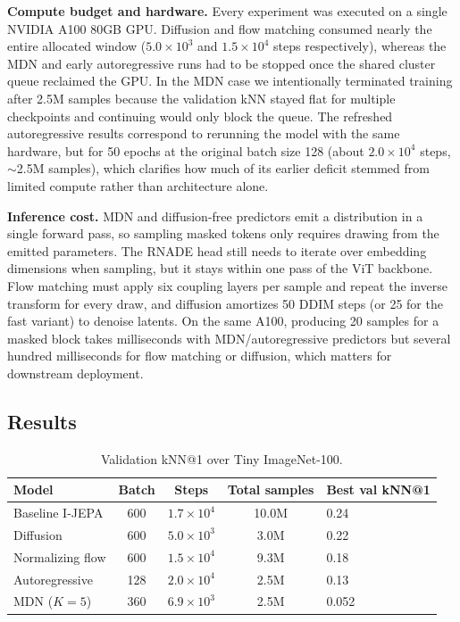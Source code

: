 \documentclass[conference]{IEEEtran}
\begin{document}
\textbf{Compute budget and hardware.} Every experiment was executed on a single NVIDIA A100 80GB GPU. Diffusion and flow matching consumed nearly the entire allocated window ($5.0\!\times\!10^3$ and $1.5\!\times\!10^4$ steps respectively), whereas the MDN and early autoregressive runs had to be stopped once the shared cluster queue reclaimed the GPU. In the MDN case we intentionally terminated training after 2.5M samples because the validation kNN stayed flat for multiple checkpoints and continuing would only block the queue. The refreshed autoregressive results correspond to rerunning the model with the same hardware, but for 50 epochs at the original batch size 128 (about $2.0\!\times\!10^4$ steps, $\sim$2.5M samples), which clarifies how much of its earlier deficit stemmed from limited compute rather than architecture alone.

\textbf{Inference cost.} MDN and diffusion-free predictors emit a distribution in a single forward pass, so sampling masked tokens only requires drawing from the emitted parameters. The RNADE head still needs to iterate over embedding dimensions when sampling, but it stays within one pass of the ViT backbone. Flow matching must apply six coupling layers per sample and repeat the inverse transform for every draw, and diffusion amortizes 50 DDIM steps (or 25 for the fast variant) to denoise latents. On the same A100, producing 20 samples for a masked block takes milliseconds with MDN/autoregressive predictors but several hundred milliseconds for flow matching or diffusion, which matters for downstream deployment.

\subsection{Results}
\begin{table}[t]
\begin{center}
\begin{tabular}{>{\raggedright}p{2.0cm}cccp{2.0cm}}
\toprule
Model & Batch & Steps & Total samples & Best val kNN@1 \\
\midrule
Baseline I-JEPA & 600 & $1.7\!\times\!10^4$ & 10.0M & 0.24 \\
Diffusion & 600 & $5.0\!\times\!10^3$ & 3.0M & 0.22 \\
Normalizing flow & 600 & $1.5\!\times\!10^4$ & 9.3M & 0.18 \\
Autoregressive & 128 & $2.0\!\times\!10^4$ & 2.5M & 0.13 \\
MDN ($K{=}5$) & 360 & $6.9\!\times\!10^3$ & 2.5M & 0.052 \\
\bottomrule
\end{tabular}
\end{center}
\caption{Validation kNN@1 over Tiny ImageNet-100.\label{tab:results}}
\end{table}
\end{document}
